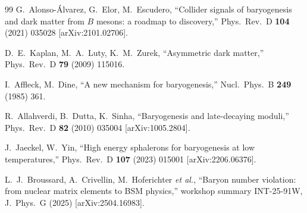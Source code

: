 \documentclass[12pt,a4paper]{article}
\begin{document}
\begin{thebibliography}{99}
 G.~Alonso-\'Alvarez, G.~Elor,
M.~Escudero, ``Collider signals of baryogenesis and dark matter from
$B$ mesons: a roadmap to discovery,'' Phys.\ Rev.\ D \textbf{104}
(2021) 035028 [arXiv:2101.02706].

 D.~E.~Kaplan, M.~A.~Luty, K.~M.~Zurek, ``Asymmetric dark
matter,'' Phys.\ Rev.\ D \textbf{79} (2009) 115016.

 I.~Affleck, M.~Dine, ``A new mechanism for
baryogenesis,'' Nucl.\ Phys.\ B \textbf{249} (1985) 361.

 R.~Allahverdi, B.~Dutta, K.~Sinha, ``Baryogenesis and
late-decaying moduli,'' Phys.\ Rev.\ D \textbf{82} (2010) 035004
[arXiv:1005.2804].

 J.~Jaeckel, W.~Yin, ``High energy sphalerons for
baryogenesis at low temperatures,'' Phys.\ Rev.\ D \textbf{107} (2023)
015001 [arXiv:2206.06376].

 L.~J.~Broussard, A.~Crivellin, M.~Hoferichter
\emph{et al.}, ``Baryon number violation: from nuclear matrix elements
to BSM physics,'' workshop summary INT-25-91W, J.\ Phys.\ G (2025)
[arXiv:2504.16983].

\end{thebibliography}
\end{document}
